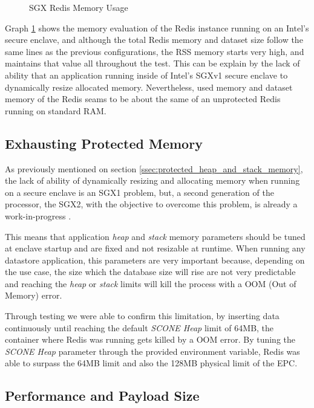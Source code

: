 \begin{figure}[htbp]
  \caption{SGX Redis Memory Usage}
  \label{fig:redis_sgx_memory}
\end{figure}

Graph \ref{fig:redis_sgx_memory} shows the memory evaluation of the Redis instance running on an Intel's secure enclave, and although the total Redis memory and dataset size follow the same lines as the previous configurations, the \gls{RSS} memory starts very high, and maintains that value all throughout the test. This can be explain by the lack of ability that an application running inside of Intel's \gls{SGX}v1 secure enclave to dynamically resize allocated memory. Nevertheless, used memory and dataset memory of the Redis seams to be about the same of an unprotected Redis running on standard \gls{RAM}.

\subsection{Exhausting Protected Memory}
\label{ssec:exhausting_protected_memory}

As previously mentioned on section \ref{ssec:protected_heap_and_stack_memory}, the lack of ability of dynamically resizing and allocating memory when running on a secure enclave is an \gls{SGX}1 problem, but, a second generation of the processor, the \gls{SGX}2, with the objective to overcome this problem, is already a work-in-progress \cite{Xing2016}.

This means that application \textit{heap} and \textit{stack} memory parameters should be tuned at enclave startup and are fixed and not resizable at runtime. When running any datastore application, this parameters are very important because, depending on the use case, the size which the database size will rise are not very predictable and reaching the \textit{heap} or \textit{stack} limits will kill the process with a \gls{OOM} (Out of Memory) error.

Through testing we were able to confirm this limitation, by inserting data continuously until reaching the default \textit{SCONE Heap} limit of 64\gls{MB}, the container where Redis was running gets killed by a \gls{OOM} error. By tuning the \textit{SCONE Heap} parameter through the provided environment variable, Redis was able to surpass the 64\gls{MB} limit and also the 128\gls{MB} physical limit of the \gls{EPC}.

\subsection{Performance and Payload Size}
\label{ssec:performance_and_payload_size}

